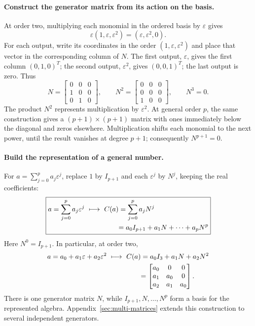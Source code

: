 \documentclass[10pt]{article}
\begin{document}
\paragraph{Construct the generator matrix from its action on the basis.}
At order two, multiplying each monomial in the ordered basis by
$\varepsilon$ gives
\begin{equation}
 \label{eq:cr-basis-action}
 \varepsilon(1,\varepsilon,\varepsilon^2)
 =(\varepsilon,\varepsilon^2,0).
\end{equation}
For each output, write its coordinates in the order
$(1,\varepsilon,\varepsilon^2)$ and place that vector in the corresponding
column of $N$. The first output, $\varepsilon$, gives the first column
$(0,1,0)^T$; the second output, $\varepsilon^2$, gives $(0,0,1)^T$; the last
output is zero. Thus
\[
 N=\begin{bmatrix}0&0&0\\1&0&0\\0&1&0\end{bmatrix},\qquad
 N^2=\begin{bmatrix}0&0&0\\0&0&0\\1&0&0\end{bmatrix},\qquad N^3=0.
\]
The product $N^2$ represents multiplication by $\varepsilon^2$.
At general order $p$, the same construction gives a $(p+1)\times(p+1)$
matrix with ones immediately below the diagonal and zeros elsewhere.
Multiplication shifts each monomial to the next power, until the result
vanishes at degree $p+1$; consequently $N^{p+1}=0$.

\paragraph{Build the representation of a general number.}
For $a=\sum_{j=0}^{p}a_j\varepsilon^j$, replace $1$ by $I_{p+1}$ and each
$\varepsilon^j$ by $N^j$, keeping the real coefficients:
\begin{equation}
 \label{eq:cr-generator-representation}
 \boxed{\begin{aligned}
 a=\sum_{j=0}^{p}a_j\varepsilon^j
 &\ \longmapsto\ C(a)=\sum_{j=0}^{p}a_jN^j\\
 &\hphantom{\ \longmapsto\ C(a)}=a_0I_{p+1}+a_1N+\cdots+a_pN^p
 \end{aligned}}
\end{equation}
Here $N^0=I_{p+1}$. In particular, at order two,
\begin{equation}
 \label{eq:cr-order-two-representation}
 \begin{aligned}
 a=a_0+a_1\varepsilon+a_2\varepsilon^2
 &\ \longmapsto\ C(a)=a_0I_3+a_1N+a_2N^2\\
 &\hphantom{\ \longmapsto\ C(a)}=
 \begin{bmatrix}a_0&0&0\\a_1&a_0&0\\a_2&a_1&a_0\end{bmatrix}.
 \end{aligned}
\end{equation}
There is one generator matrix $N$, while $I_{p+1},N,\ldots,N^p$ form a basis
for the represented algebra. Appendix~\ref{sec:multi-matrices} extends this
construction to several independent generators.
\end{document}
